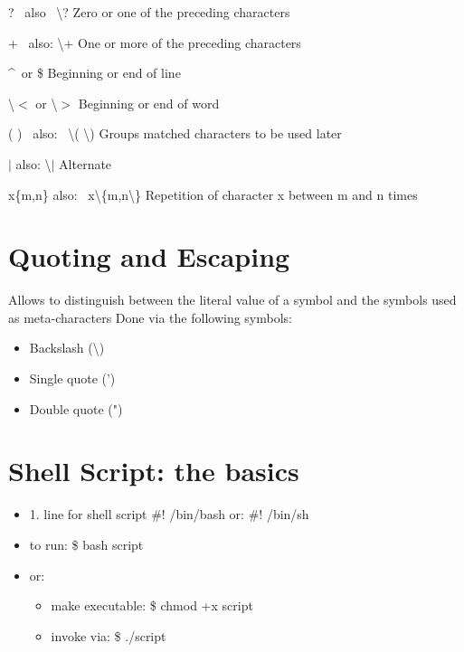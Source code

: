 \documentclass{report}
\begin{document}
\noindent ? \ also \ \textbackslash ? \hspace{2mm} Zero or one of the preceding characters \vspace{2mm}

\noindent + \ also: \textbackslash +  \hspace{2mm} One or more of the preceding characters \vspace{2mm}

\noindent \textasciicircum  \ or  \$ \hspace{10mm} Beginning or end of line \vspace{2mm}

\noindent \textbackslash $<$ or \textbackslash $>$ \hspace{10mm} Beginning or end of word \vspace{2mm}

\noindent ( ) \ also: \ \textbackslash( \textbackslash) \hspace{3mm} Groups matched characters to be used later \vspace{2mm}

\noindent $|$ also: \textbackslash$|$ \hspace{10mm} Alternate\vspace{2mm}

\noindent x\{m,n\} also: \ x\textbackslash\{m,n\textbackslash\} \hspace{2mm} Repetition of character x between m and n times
\newpage
\section{Quoting and Escaping}
Allows to distinguish between the literal value of a symbol and the symbols used as meta-characters
\bigbreak \noindent
Done via the following symbols:
\begin{itemize}
  \item Backslash (\textbackslash)
  \item Single quote (')
  \item Double quote (")
\end{itemize}
\section{Shell Script: the basics}
\begin{itemize}
  \item 1. line for shell script
    \subitem \#! /bin/bash
    \subitem or: \#! /bin/sh
  \item to run:
    \subitem \$ bash script
  \item or:
    \begin{itemize}[label=$\circ$]
      \item make executable: \hspace{5mm} \$ chmod +x script
      \item invoke via: \hspace{15mm} \$ ./script
    \end{itemize}
\end{itemize}
\end{document}
